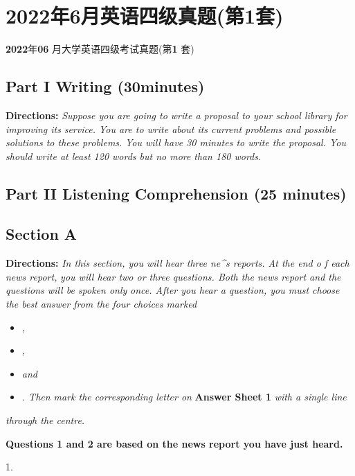 \documentclass[UTF8,11pt]{ctexart}
\begin{document}
\section*{2022年6月英语四级真题(第1套)}
\textbf{2022}年\textbf{06} 月大学英语四级考试真题(第\textbf{1} 套)


\subsection*{\textbf{Part I} \textbf{Writing} \textbf{(30minutes)}}


\textbf{Directions: }\textit{Suppose you are going to write a proposal to your school library for improving its} \textit{service. You are to write about its current problems and possible solutions to these problems.} \textit{You will have 30 minutes to write the proposal. You should write at least 120 words but no more} \textit{than 180 words.}


\subsection*{\textbf{Part II} \textbf{Listening Comprehension} \textbf{(25 minutes)}}


\subsection*{\textbf{Section A}}


\textbf{Directions: }\textit{In this section, you will hear three ne\textasciicircum{}s reports. At the end o f each news report,} \textit{you will hear two or three questions. Both the news report and the questions will be spoken only} \textit{once. After you hear a question, you must choose the best answer from the four choices marked}


\begin{itemize}[leftmargin=2em,itemsep=.2em,topsep=.4em]\item[A.] \textit{,}
\item[B.] \textit{,}
\item[C.] \textit{and}
\item[D.] \textit{. Then mark the corresponding letter on}\textbf{ Answer Sheet 1 }\textit{with a single line}
\end{itemize}

\textit{through the centre.}


\textbf{Questions 1 and 2 are based on the news report you have just heard.}


1.
\end{document}
